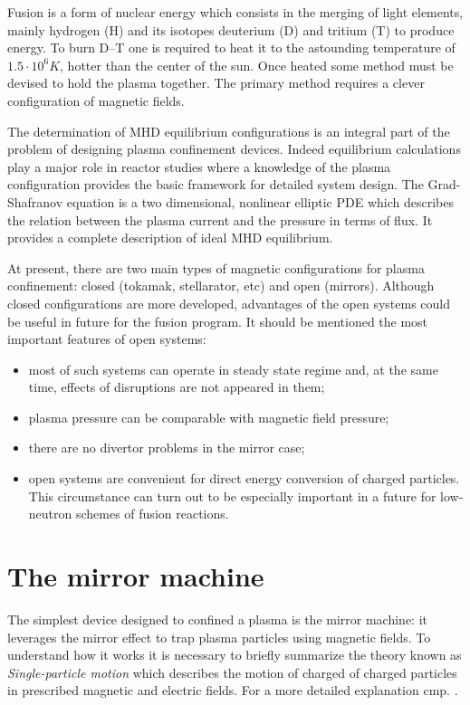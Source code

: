 Fusion is a form of nuclear energy which consists in the merging of light elements, mainly hydrogen (H) and its isotopes deuterium (D) and tritium (T) to produce energy. To burn D–T one is required to heat it to the astounding temperature of $1.5\cdot 10^6 K$, hotter than the center of the sun. Once heated some method must be devised to hold the plasma together. The primary method requires a clever configuration of magnetic fields.
\medskip

The determination of MHD equilibrium configurations is an integral part of the problem of designing plasma confinement devices. Indeed equilibrium calculations play a major role in reactor studies where a knowledge of the plasma configuration provides the basic framework for detailed system design. The Grad-Shafranov equation is a two dimensional, nonlinear elliptic PDE which describes the relation between the plasma current and the pressure in terms of flux. It provides a complete description of ideal MHD equilibrium.
\medskip

At present, there are two main types of magnetic configurations for plasma confinement: closed (tokamak, stellarator, etc) and open (mirrors). Although closed configurations are more developed, advantages of the open systems could be useful in future for the fusion program. It should be mentioned the most important features of open systems:
\begin{itemize}
  \item most of such systems can operate in steady state regime and, at the same time, effects of disruptions are not appeared in them;
  \item plasma pressure can be comparable with magnetic field pressure;
  \item there are no divertor problems in the mirror case;
  \item open systems are convenient for direct energy conversion of charged particles. This circumstance can turn out to be especially important in a future for low-neutron schemes of fusion reactions.
\end{itemize}

\section{The mirror machine}\label{sec:mirror_machine}
The simplest device designed to confined a plasma is the mirror machine: it leverages the mirror effect to trap plasma particles using magnetic fields. To understand how it works it is necessary to briefly summarize the theory known as \textit{Single-particle motion} which describes the motion of charged of charged particles in prescribed magnetic and electric fields. For a more detailed explanation cmp. \cite{plasma}.

